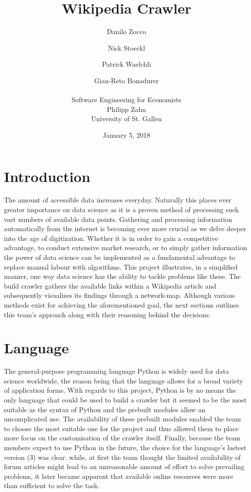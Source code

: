 \documentclass[10pt]{article}
\title{Wikipedia Crawler}
\author{Danilo Zocco
	\and Nick Stoeckl
	\and Patrick Waelchli 
	\and Gian-Reto Bonadurer
	\\ \\
	\small Software Engineering for Economists\\
	\small Philipp Zahn\\
	\small University of St. Gallen}
\date{January 5, 2018}
\begin{document}
\maketitle
\newpage

\tableofcontents
\newpage


\section{Introduction}

The amount of accessible data increases everyday. Naturally this places ever greater importance on data science as it is a proven method of processing such vast numbers of available data points. \cite{dat} Gathering and processing information automatically from 
the internet is becoming ever more crucial as we delve deeper into the age of digitization. Whether it is in order to gain a competitive advantage, to conduct extensive market research, or to simply gather information the power of data science can be implemented as a fundamental advantage to replace manual labour with algorithms. 
This project illustrates, in a simplified manner, one way data science has the ability to tackle problems like these. The build crawler gathers the available links within a Wikipedia article and subsequently visualizes its findings through a network-map. Although various methods exist for achieving the aforementioned goal, the next sections outlines this team's approach along with their reasoning behind the decisions.


\section{Language}

The general-purpose programming language Python is widely used for data science worldwide, the reason being that the language allows for a broad variety of application forms. \cite{pyt} With regards to this project, Python is by no means the only language that could be used to build a crawler but it seemed to be the most suitable as the syntax of Python and the prebuilt modules allow an uncomplicated use. The availability of these prebuilt modules enabled the team to choose the most suitable one for the project and thus allowed them to place more focus on the customisation of the crawler itself. Finally, because the team members expect to use Python in the future, the choice for the language's lastest version (3) was clear. while, at first the team thought the limited availability of forum articles might lead to an unreasonable amount of effort to solve prevailing problems, it later became apparent that available online resources were more than sufficient to solve the task. 
\end{document}
